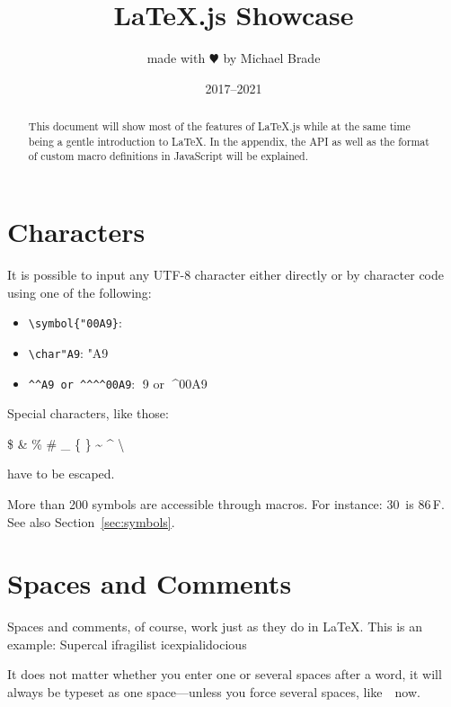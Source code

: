 \documentclass{article}
\title{\LaTeX.js Showcase}
\author{made with $\varheartsuit$ by Michael Brade}
\date{2017--2021}
\begin{document}
\maketitle


\begin{abstract}
This document will show most of the features of \LaTeX.js while at the same time being a gentle introduction to \LaTeX.
In the appendix, the API as well as the format of custom macro definitions in JavaScript will be explained.
\end{abstract}


\section{Characters}

It is possible to input any UTF-8 character either directly or by character code
using one of the following:

\begin{itemize}
    \item \texttt{\textbackslash symbol\{"00A9\}}: 
    \item \verb|\char"A9|: \char"A9
    \item \verb|^^A9 or ^^^^00A9|: ^^A9 or ^^^^00A9
\end{itemize}

\bigskip

\noindent
Special characters, like those:
\begin{center}
\$ \& \% \# \_ \{ \} \~{} \^{} \textbackslash %
\end{center}
%
have to be escaped.

More than 200 symbols are accessible through macros. For instance: 30\,\textcelsius{} is
86\,\textdegree{}F. See also Section~\ref{sec:symbols}.



\section{Spaces and Comments}

Spaces and comments, of course, work just as they do in \LaTeX.
This is an            %
example: Supercal%
                ifragilist%
    icexpialidocious

It does not matter whether you enter one or several     spaces after a word, it
will always be typeset as one space---unless you force several spaces, like\ \ now.
\end{document}
